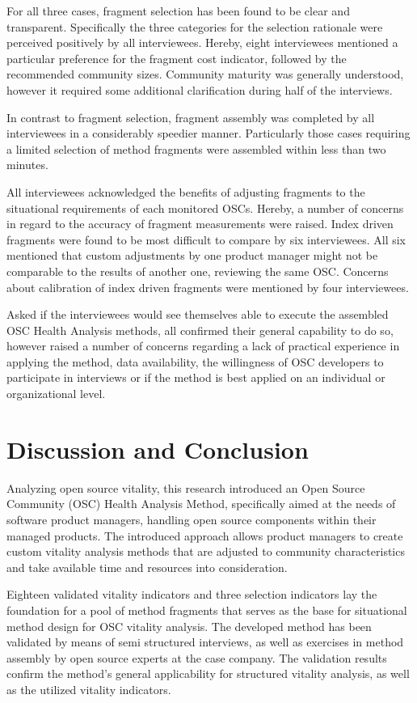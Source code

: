 \documentclass[final,5p,times,twocolumn]{elsarticle}
\begin{document}
For all three cases, fragment selection has been found to be clear and transparent. Specifically the three categories for the selection rationale were perceived positively by all interviewees. Hereby, eight interviewees mentioned a particular preference for the fragment cost indicator, followed by the recommended community sizes. Community maturity was generally understood, however it required some additional clarification during half of the interviews.

In contrast to fragment selection, fragment assembly was completed by all interviewees in a considerably speedier manner. Particularly those cases requiring a limited selection of method fragments were assembled within less than two minutes.

All interviewees acknowledged the benefits of adjusting fragments to the situational requirements of each monitored OSCs. Hereby, a number of concerns in regard to the accuracy of fragment measurements were raised. Index driven fragments were found to be most difficult to compare by six interviewees. All six mentioned that custom adjustments by one product manager might not be comparable to the results of another one, reviewing the same OSC. Concerns about calibration of index driven fragments were mentioned by four interviewees.

Asked if the interviewees would see themselves able to execute the assembled OSC Health Analysis methods, all confirmed their general capability to do so, however raised a number of concerns regarding a lack of practical experience in applying the method,  data availability, the willingness of OSC developers to participate in interviews or if the method is best applied on an individual or organizational level.
\section{Discussion and Conclusion}
\label{discussion_conclusion_section}
Analyzing open source vitality, this research introduced an Open Source Community (OSC) Health Analysis Method, specifically aimed at the needs of software product managers, handling open source components within their managed products. The introduced approach allows product managers to create custom vitality analysis methods that are adjusted to community characteristics and take available time and resources into consideration.

Eighteen validated vitality indicators and three selection indicators lay the foundation for a pool of method fragments that serves as the base for situational method design for OSC vitality analysis. The developed method has been validated by means of semi structured interviews, as well as exercises in method assembly by open source experts at the case company. The validation results confirm the method's general applicability for structured vitality analysis, as well as the utilized vitality indicators.
\end{document}

